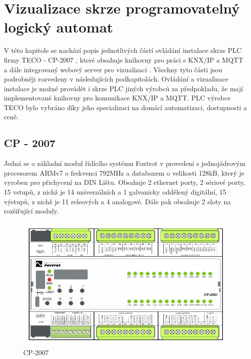 \chapter{Vizualizace skrze programovatelný logický automat}
\label{sec:vizualizace_automat}
V této kapitole se nachází popis jednotlivých částí ovládání instalace skrze PLC firmy TECO - CP-2007 \cite{TECO}, které obsahuje knihovny pro práci s KNX/IP \cite{KNXlib} a MQTT \cite{MQTTlib} a dále integrovaný webový server pro vizualizaci \cite{WebMaker}. Všechny tyto části jsou podrobněji rozvedeny v následujících podkapitolách.
Ovládání a vizualizace instalace je možné provádět i skrze PLC jiných výrobců za předpokladu, že mají implementované knihovny pro komunikace KNX/IP a MQTT. PLC výrobce TECO bylo vybráno díky jeho specializaci na domácí automatizaci, dostupnosti a ceně.
\section{CP - 2007}
Jedná se o základní modul řídícího systému Foxtrot v provedení s jednojádrovým procesorem ARMv7 o frekvenci 792MHz a databoxem o velikosti 128kB, který je vyroben pro přichycení na DIN Lištu. Obsahuje 2 ethernet porty, 2 sériové porty, 15 vstupů, z nichž je 14 univerzálních a 1 galvanicky oddělený digitální, 15 výstupů, z nichž je 11 releových a 4 analogové. Dále pak obsahuje 2 sloty na rozšiřující moduly. \cite{TECO}

\begin{figure}[!ht]
    \begin{center}
        \includegraphics[scale=0.7]{obrazky/CP-2007.png}
    \end{center}
    \caption[CP-2007 \cite{TECO}]{CP-2007 \cite{TECO}}
    \label{fig:CP-2007}
\end{figure}

